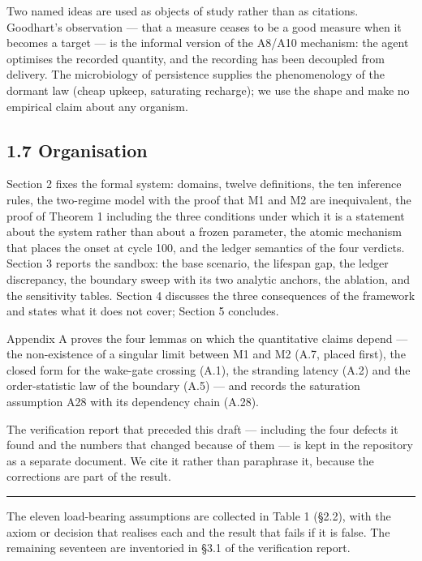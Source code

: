 \documentclass[11pt,a4paper]{article}
\begin{document}
Two named ideas are used as objects of study rather than as citations.
Goodhart's observation --- that a measure ceases to be a good measure when it
becomes a target --- is the informal version of the A8/A10 mechanism: the agent
optimises the recorded quantity, and the recording has been decoupled from
delivery. The microbiology of persistence supplies the phenomenology of the
dormant law (cheap upkeep, saturating recharge); we use the shape and make no
empirical claim about any organism.

\subsection{1.7 Organisation}\label{organisation}

Section 2 fixes the formal system: domains, twelve definitions, the ten
inference rules, the two-regime model with the proof that M1 and M2 are
inequivalent, the proof of Theorem 1 including the three conditions under which
it is a statement about the system rather than about a frozen parameter, the
atomic mechanism that places the onset at cycle 100, and the ledger semantics of
the four verdicts. Section 3 reports the sandbox: the base scenario, the lifespan
gap, the ledger discrepancy, the boundary sweep with its two analytic anchors, the
ablation, and the sensitivity tables. Section 4 discusses the three consequences
of the framework and states what it does not cover; Section 5 concludes.

Appendix A proves the four lemmas on which the quantitative claims depend --- the
non-existence of a singular limit between M1 and M2 (A.7, placed first), the
closed form for the wake-gate crossing (A.1), the stranding latency (A.2) and the
order-statistic law of the boundary (A.5) --- and records the saturation assumption
A28 with its dependency chain (A.28).

The verification report that preceded this draft --- including the four defects it
found and the numbers that changed because of them --- is kept in the repository as
a separate document. We cite it rather than paraphrase it, because the
corrections are part of the result.

\begin{center}\rule{0.5\linewidth}{0.5pt}\end{center}

The eleven load-bearing assumptions are collected in Table 1 (§2.2), with the
axiom or decision that realises each and the result that fails if it is false. The
remaining seventeen are inventoried in §3.1 of the verification report.
\end{document}
